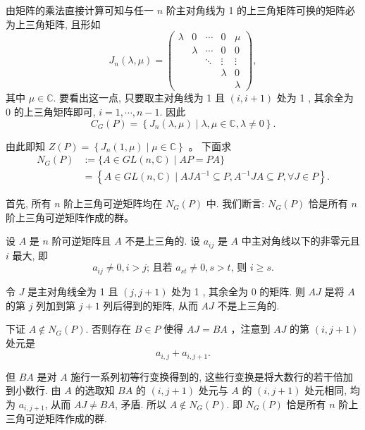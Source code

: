 \begin{solution}
    由矩阵的乘法直接计算可知与任一 $n$ 阶主对角线为 1 的上三角矩阵可换的矩阵必为上三角矩阵, 且形如
    $$
        J_n(\lambda, \mu)=\left(\begin{array}{ccccc}
                \lambda & 0       & \cdots & 0       & \mu     \\
                        & \lambda & \cdots & 0       & 0       \\
                        &         & \ddots & \vdots  & \vdots  \\
                        &         &        & \lambda & 0       \\
                        &         &        &         & \lambda
            \end{array}\right),
    $$
    其中 $\mu \in \mathbb{C}$. 要看出这一点, 只要取主对角线为 1 且 $(i, i+1)$ 处为 1 , 其余全为 0 的上三角矩阵即可, $i=1, \cdots, n-1$. 因此
    $$
        C_G(P)=\left\{J_n(\lambda, \mu) \mid \lambda, \mu \in \mathbb{C}, \lambda \neq 0\right\} .
    $$

    由此即知 $Z(P)=\left\{J_n(1, \mu) \mid \mu \in \mathbb{C}\right\}$ 。
    下面求
    $$
        \begin{aligned}
            N_G(P) & :=\{A \in G L(n, \mathbb{C}) \mid A P=P A\}                                                                     \\
                   & =\left\{A \in G L(n, \mathbb{C}) \mid A J A^{-1} \subseteq P, A^{-1} J A \subseteq P, \forall J \in P\right\} .
        \end{aligned}
    $$

    首先, 所有 $n$ 阶上三角可逆矩阵均在 $N_G(P)$ 中. 我们断言: $N_G(P)$ 恰是所有 $n$ 阶上三角可逆矩阵作成的群。

    设 $A$ 是 $n$ 阶可逆矩阵且 $A$ 不是上三角的. 设 $a_{i j}$ 是 $A$ 中主对角线以下的非零元且 $i$ 最大, 即
    $$
        a_{i j} \neq 0, i>j \text {; 且若 } a_{s t} \neq 0, s>t \text {, 则 } i \geqslant s .
    $$

    令 $J$ 是主对角线全为 1 且 $(j, j+1)$ 处为 1 , 其余全为 0 的矩阵. 则 $A J$ 是将 $A$的第 $j$ 列加到第 $j+1$ 列后得到的矩阵, 从而 $A J$ 不是上三角的.

    下证 $A \notin N_G(P)$. 否则存在 $B \in P$ 使得 $A J=B A$ ，注意到 $A J$ 的第 $(i, j+1)$处元是
    $$
        a_{i, j}+a_{i, j+1} .
    $$

    但 $B A$ 是对 $A$ 施行一系列初等行变换得到的, 这些行变换是将大数行的若干倍加到小数行. 由 $A$ 的选取知 $B A$ 的 $(i, j+1)$ 处元与 $A$ 的 $(i, j+1)$ 处元相同, 均为 $a_{i, j+1}$, 从而 $A J \neq B A$, 矛盾. 所以 $A \notin N_G(P)$. 即 $N_G(P)$ 恰是所有 $n$ 阶上三角可逆矩阵作成的群.
\end{solution}

